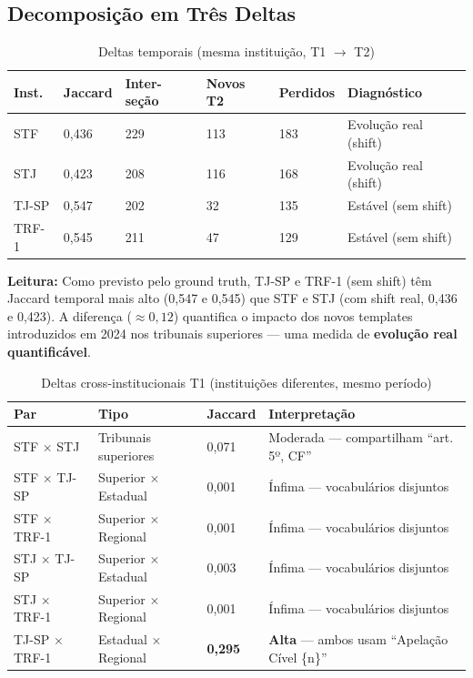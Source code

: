 \documentclass[12pt,a4paper]{article}
\theoremstyle{remark}
\begin{document}
\subsection{Decomposição em Três Deltas}

\begin{table}[H]\centering\footnotesize
\caption{Deltas temporais (mesma instituição, T1 $\to$ T2)}
\label{tab:deltas_temporal}
\begin{tabular}{p{}p{}p{}p{}p{}p{}}
\toprule
\textbf{Inst.} & \textbf{Jaccard} & \textbf{Inter-seção} & \textbf{Novos T2} & \textbf{Perdidos} & \textbf{Diagnóstico} \\
\midrule
STF   & 0,436 & 229 & 113 & 183 & Evolução real (shift) \\
STJ   & 0,423 & 208 & 116 & 168 & Evolução real (shift) \\
TJ-SP & 0,547 & 202 & 32  & 135 & Estável (sem shift) \\
TRF-1 & 0,545 & 211 & 47  & 129 & Estável (sem shift) \\
\bottomrule
\end{tabular}
\end{table}

\textbf{Leitura:} Como previsto pelo ground truth, TJ-SP e TRF-1 (sem shift) têm Jaccard temporal mais alto (0,547 e 0,545) que STF e STJ (com shift real, 0,436 e 0,423). A diferença ($\approx 0,12$) quantifica o impacto dos novos templates introduzidos em 2024 nos tribunais superiores — uma medida de \textbf{evolução real quantificável}.

\begin{table}[H]\centering\footnotesize
\caption{Deltas cross-institucionais T1 (instituições diferentes, mesmo período)}
\label{tab:deltas_cross_t1}
\begin{tabular}{p{}p{}p{}p{}}
\toprule
\textbf{Par} & \textbf{Tipo} & \textbf{Jaccard} & \textbf{Interpretação} \\
\midrule
STF $\times$ STJ   & Tribunais superiores & 0,071 & Moderada — compartilham ``art. 5º, CF'' \\
STF $\times$ TJ-SP & Superior $\times$ Estadual & 0,001 & Ínfima — vocabulários disjuntos \\
STF $\times$ TRF-1 & Superior $\times$ Regional & 0,001 & Ínfima — vocabulários disjuntos \\
STJ $\times$ TJ-SP & Superior $\times$ Estadual & 0,003 & Ínfima — vocabulários disjuntos \\
STJ $\times$ TRF-1 & Superior $\times$ Regional & 0,001 & Ínfima — vocabulários disjuntos \\
TJ-SP $\times$ TRF-1 & Estadual $\times$ Regional & \textbf{0,295} & \textbf{Alta} — ambos usam ``Apelação Cível \{n\}'' \\
\bottomrule
\end{tabular}
\end{table}
\end{document}
